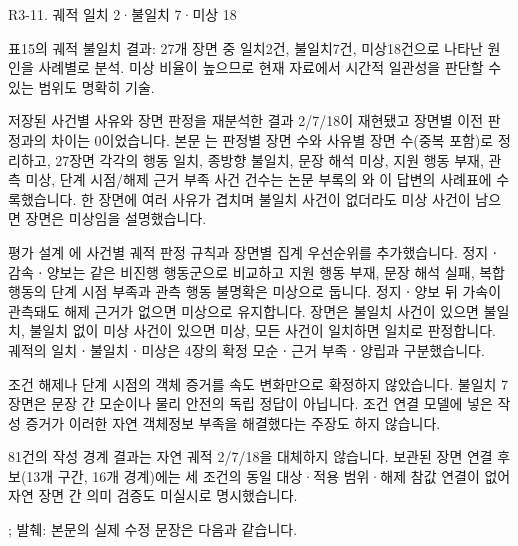 \clearpage

\begin{reviewitem}{R3-11. 궤적 일치 2·불일치 7·미상 18}

\begin{reviewercomment}

표15의 궤적 불일치 결과: 27개 장면 중 일치2건, 불일치7건, 미상18건으로 나타난 원인을 사례별로 분석. 미상 비율이 높으므로 현재 자료에서 시간적 일관성을 판단할 수 있는 범위도 명확히 기술.

\end{reviewercomment}

\begin{authorresponse}

저장된 사건별 사유와 장면 판정을 재분석한 결과 2/7/18이 재현됐고 장면별 이전 판정과의 차이는 0이었습니다. 본문 는 판정별 장면 수와 사유별 장면 수(중복 포함)로 정리하고, 27장면 각각의 행동 일치, 종방향 불일치, 문장 해석 미상, 지원 행동 부재, 관측 미상, 단계 시점/해제 근거 부족 사건 건수는 논문 부록의 와 이 답변의 사례표에 수록했습니다. 한 장면에 여러 사유가 겹치며 불일치 사건이 없더라도 미상 사건이 남으면 장면은 미상임을 설명했습니다.

평가 설계 에 사건별 궤적 판정 규칙과 장면별 집계 우선순위를 추가했습니다. 정지ㆍ감속ㆍ양보는 같은 비진행 행동군으로 비교하고 지원 행동 부재, 문장 해석 실패, 복합 행동의 단계 시점 부족과 관측 행동 불명확은 미상으로 둡니다. 정지ㆍ양보 뒤 가속이 관측돼도 해제 근거가 없으면 미상으로 유지합니다. 장면은 불일치 사건이 있으면 불일치, 불일치 없이 미상 사건이 있으면 미상, 모든 사건이 일치하면 일치로 판정합니다. 궤적의 일치ㆍ불일치ㆍ미상은 4장의 확정 모순ㆍ근거 부족ㆍ양립과 구분했습니다.

조건 해제나 단계 시점의 객체 증거를 속도 변화만으로 확정하지 않았습니다. 불일치 7장면은 문장 간 모순이나 물리 안전의 독립 정답이 아닙니다. 조건 연결 모델에 넣은 작성 증거가 이러한 자연 객체정보 부족을 해결했다는 주장도 하지 않습니다.

81건의 작성 경계 결과는 자연 궤적 2/7/18을 대체하지 않습니다. 보관된 장면 연결 후보(13개 구간, 16개 경계)에는 세 조건의 동일 대상·적용 범위·해제 참값 연결이 없어 자연 장면 간 의미 검증도 미실시로 명시했습니다.

\end{authorresponse}

\begin{manuscriptrevision}{; 발췌: }
본문의 실제 수정 문장은 다음과 같습니다.


\end{manuscriptrevision}
\end{reviewitem}
